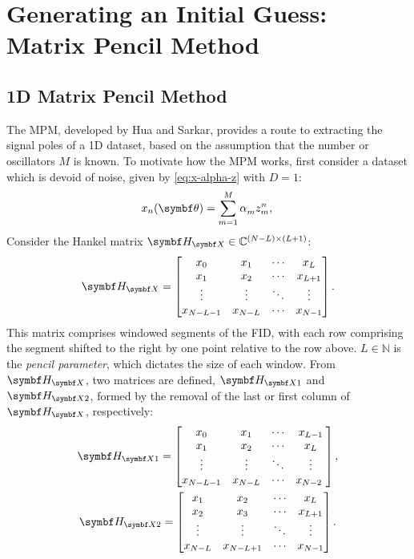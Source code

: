 \section{Generating an Initial Guess: Matrix Pencil Method}
\label{sec:mpm}

\subsection{1D Matrix Pencil Method}
\label{subsec:mpm}
The \ac{MPM}, developed by Hua and Sarkar\cite{Hua1990,Hua1990b,Hua1991}, provides a
route to extracting the signal poles of a \ac{1D} dataset, based on the
assumption that the number or oscillators $M$ is known.
To motivate how the \ac{MPM} works, first consider a dataset which is devoid of
noise, given by \eqref{eq:x-alpha-z} with $D=1$:
\begin{equation}
    x_n(\bth) = \sumM \alpha_m^{\vphantom{n}} z_m^n,\\
\end{equation}
Consider the Hankel matrix $\HX \in \mathbb{C}^{(N-L) \times (L+1)}$:
\begin{equation}
    \HX =
    \begin{bmatrix}
        x_0 & x_1 & \cdots & x_L\\
        x_1 & x_2 & \cdots & x_{L+1}\\
        \vdots & \vdots & \ddots & \vdots\\
        x_{N-L-1} & x_{N-L} & \cdots & x_{N-1}
    \end{bmatrix}.
\end{equation}
This matrix comprises windowed segments of the FID, with each row comprising
the segment shifted to the right by one point relative to the row above. $L \in
\mathbb{N}$ is the \emph{pencil parameter}, which dictates the size of each
window. From $\HX$, two matrices are defined, $\HXone$ and $\HXtwo$, formed by
the removal of the last or first column of $\HX$, respectively:
\begin{subequations}
   \begin{gather}
        \HXone =
        \begin{bmatrix}
            x_0 & x_1 & \cdots & x_{L-1} \\
            x_{1} & x_{2} & \cdots & x_{L} \\
            \vdots & \vdots & \ddots & \vdots\\
            x_{N-L-1} & x_{N-L} & \cdots & x_{N-2}\
        \end{bmatrix}, \\
        \HXtwo =
        \begin{bmatrix}
            x_{1} & x_{2} & \cdots & x_{L} \\
            x_{2} & x_{3} & \cdots & x_{L+1} \\
            \vdots & \vdots & \ddots & \vdots\\
            x_{N-L} & x_{N-L+1} & \cdots & x_{N-1}\\
        \end{bmatrix}.
   \end{gather}
\end{subequations}
